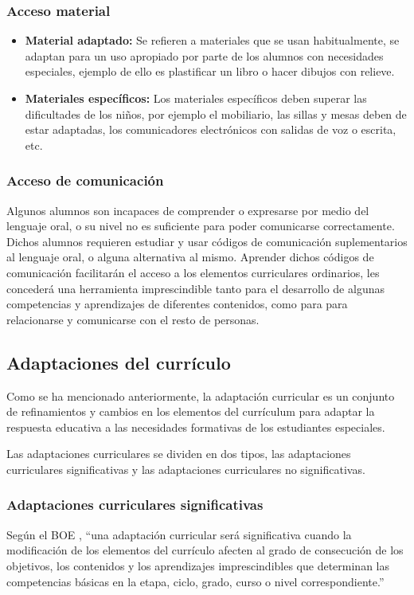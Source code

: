 \subsubsection{Acceso material}
\begin{itemize}
    \item \textbf{Material adaptado:} Se refieren a materiales que se usan habitualmente, se adaptan para un uso apropiado por parte de los alumnos con necesidades especiales, ejemplo de ello es plastificar un libro o hacer dibujos con relieve.
    \item \textbf{Materiales específicos:} Los materiales específicos deben superar las dificultades de los niños, por ejemplo el mobiliario, las sillas y mesas deben de estar adaptadas, los comunicadores electrónicos con salidas de voz o escrita, etc.
\end{itemize}

\subsubsection{Acceso de comunicación}
Algunos alumnos son incapaces de comprender o expresarse por medio del lenguaje oral, o su nivel no es suficiente para poder comunicarse correctamente. Dichos alumnos requieren estudiar y usar códigos de comunicación suplementarios al lenguaje oral, o alguna alternativa al mismo. Aprender dichos códigos de comunicación facilitarán el acceso a los elementos curriculares ordinarios, les concederá una herramienta imprescindible tanto para el desarrollo de algunas competencias y aprendizajes de diferentes contenidos, como para para relacionarse y comunicarse con el resto de personas.

\subsection{Adaptaciones del currículo}

Como se ha mencionado anteriormente, la adaptación curricular es un conjunto de refinamientos y cambios en los elementos del currículum para adaptar la respuesta educativa a las necesidades formativas de los estudiantes especiales. 

Las adaptaciones curriculares se dividen en dos tipos, las adaptaciones curriculares significativas y las adaptaciones curriculares no significativas. 
\subsubsection{Adaptaciones curriculares significativas}
Según el BOE \citep{BOE}, ``una adaptación curricular será significativa cuando la modificación de los elementos del currículo afecten al grado de consecución de los objetivos, los contenidos y los aprendizajes imprescindibles que determinan las competencias básicas en la etapa, ciclo, grado, curso o nivel correspondiente.''

